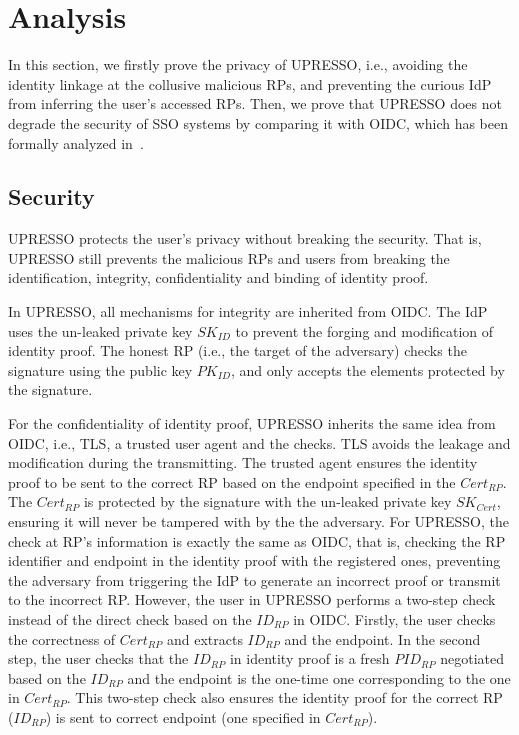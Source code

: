 ﻿\section{Analysis}
\label{sec:analysis}
In this section, we firstly prove the privacy of UPRESSO, i.e., avoiding the identity linkage at the collusive malicious RPs,
and preventing the curious IdP from inferring the user's accessed RPs.
Then, we prove that UPRESSO does not degrade the security of SSO systems by comparing it with OIDC, which has been formally analyzed in~\cite{FettKS17}.


\subsection{Security}
\label{subsec:security}
UPRESSO protects the user's privacy without breaking the security. That is, UPRESSO still prevents the malicious RPs and users from breaking the identification, integrity, confidentiality and binding of identity proof.

In UPRESSO, all mechanisms for integrity are inherited from OIDC. The IdP uses the un-leaked private key $SK_{ID}$ to prevent the forging and modification of identity proof. The honest RP (i.e., the target of the adversary) checks the signature using the public key $PK_{ID}$, and only accepts the elements protected by the signature.

For the confidentiality of identity proof, UPRESSO inherits the same idea from OIDC, i.e., TLS, a trusted user agent and the checks. TLS avoids the leakage and modification during the transmitting. The trusted agent ensures the identity proof to be sent to the correct RP based on the endpoint specified in the $Cert_{RP}$. The  $Cert_{RP}$ is protected by the signature with the un-leaked private key $SK_{Cert}$, ensuring it  will never be tampered with by the the adversary. For UPRESSO, the check at RP's information is exactly the same as OIDC, that is, checking the RP identifier and endpoint in the identity proof with the registered ones, preventing the adversary from triggering the IdP to
generate an incorrect proof or transmit to the incorrect RP. However, the user in UPRESSO performs a two-step check instead of the direct check based on the $ID_{RP}$ in OIDC. Firstly, the user checks the correctness of $Cert_{RP}$ and extracts  $ID_{RP}$ and the endpoint. In the second step, the user checks that the $ID_{RP}$ in identity proof is a fresh $PID_{RP}$ negotiated based on the $ID_{RP}$ and the endpoint is the one-time one corresponding to the one in $Cert_{RP}$. This two-step check also ensures the identity proof for the correct RP ($ID_{RP}$) is sent to correct endpoint (one specified in $Cert_{RP}$).

